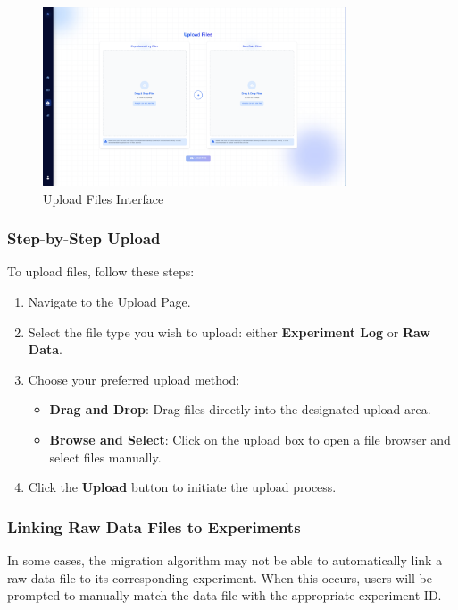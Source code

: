 \documentclass[12pt]{article}
\begin{document}
\begin{figure}[H]
    \centering
    \includegraphics[width=0.8\textwidth]{./Diagrams/Upload.png}
    \caption{Upload Files Interface}
\end{figure}

\subsubsection{Step-by-Step Upload}
To upload files, follow these steps:
\begin{enumerate}
    \item Navigate to the Upload Page.
    \item Select the file type you wish to upload: either \textbf{Experiment
    Log} or \textbf{Raw Data}.
    \item Choose your preferred upload method:
    \begin{itemize}
        \item \textbf{Drag and Drop}: Drag files directly into the designated
        upload area.
        \item \textbf{Browse and Select}: Click on the upload box to open a file
        browser and select files manually.
    \end{itemize}
    \item Click the \textbf{Upload} button to initiate the upload process.
\end{enumerate}

\subsubsection{Linking Raw Data Files to Experiments}

In some cases, the migration algorithm may not be able to automatically link a
raw data file to its corresponding experiment. When this occurs, users will be
prompted to manually match the data file with the appropriate experiment ID.
\end{document}
